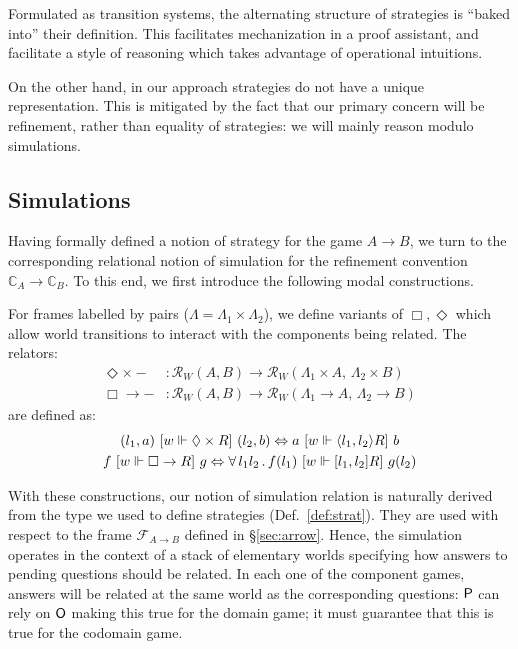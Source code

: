 Formulated as transition systems,
the alternating structure of strategies
is ``baked into'' their definition.
This facilitates
mechanization in a proof assistant,
and facilitate a style of reasoning
which takes advantage of operational intuitions.

On the other hand,
in our approach strategies do not have a unique representation.
This is mitigated by the fact that
our primary concern will be refinement,
rather than equality of strategies:
we will mainly reason modulo simulations.



\subsection{Simulations} %
\label{sec:sim}

Having formally defined a notion of strategy
for the game $A \rightarrow B$,
we turn to the corresponding relational notion of simulation
for the refinement convention $\mathbb{C}_A \rightarrow \mathbb{C}_B$.
To this end,
we first introduce the following modal constructions.

\begin{definition} %
For frames labelled by pairs
($\Lambda = \Lambda_1 \times \Lambda_2$),
we define variants of $\Box, \Diamond$ which
allow world transitions to interact with the components
being related.
The relators:
\begin{align*}
  \Diamond \times {-} &: \mathcal{R}_W(A, B) \rightarrow
              \mathcal{R}_W(\Lambda_1 \times A, \, \Lambda_2 \times B) \\
  \Box \rightarrow - &: \mathcal{R}_W(A, B) \rightarrow
          \mathcal{R}_W(\Lambda_1 \rightarrow A, \, \Lambda_2 \rightarrow B)
\end{align*}
are defined as:
\begin{gather*}
  (l_1, a) \ [{w \Vdash \Diamond \times R}]\  (l_2, b) \Leftrightarrow
    a \ [{w \Vdash \langle l_1, l_2 \rangle R}]\  b \\
  f \ [{w \Vdash \Box \rightarrow R}]\  g \Leftrightarrow
    \forall \, l_1 l_2 \,.\, f(l_1) \ [{w \Vdash [l_1, l_2] R}]\  g(l_2)
\end{gather*}
\end{definition}

With these constructions,
our notion of simulation relation
is naturally derived from
the type we used to define strategies (Def.~\ref{def:strat}).
They are used
with respect to the frame $\mathcal{F}_{A \rightarrow B}$
defined in \S\ref{sec:arrow}.
Hence, the simulation operates in the context of
a stack of elementary worlds
specifying how answers to pending questions
should be related.
In each one of the component games,
answers will be related at the same world as the corresponding questions:
$ \mathsf{P} $ can rely on $ \mathsf{O} $ making this true for the domain game;
it must guarantee that this is true for the codomain game.

